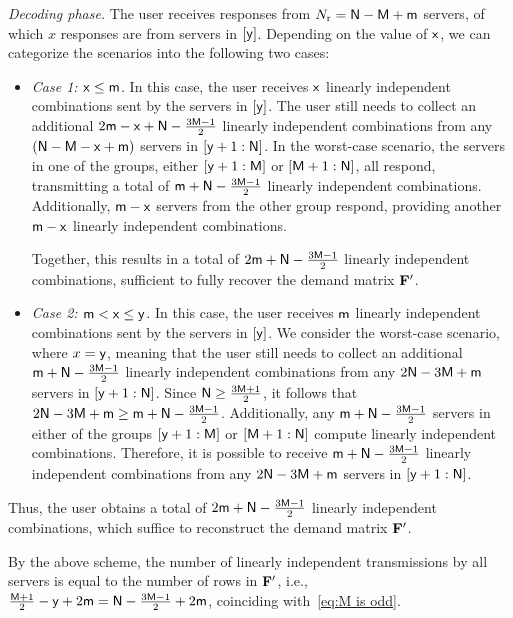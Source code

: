 \documentclass[conference,letterpaper]{IEEEtran}
\begin{document}
  
  {\it Decoding phase.}
The user receives responses from $N_{\rm r} = {\sf N} - {\sf M} + {\sf m}$ servers, of which $x$ responses are from servers in $[{\sf y}]$. Depending on the value of ${\sf x}$, we can categorize the scenarios into the following two cases:
\begin{itemize}
\item {\it Case 1: ${\sf x} \leq {\sf m}$.} In this case, the user receives ${\sf x}$ linearly independent combinations sent by the servers in $[{\sf y}]$. The user still needs to collect an additional $2{\sf m} - {\sf x} + {\sf N} - \frac{3{\sf M} - 1}{2}$ linearly independent combinations from any $({\sf N} - {\sf M} - {\sf x} + {\sf m})$ servers in $[{\sf y} + 1 : {\sf N}]$.
In the worst-case scenario, the servers in one of the groups, either $[{\sf y} + 1 : {\sf M}]$ or $[{\sf M} + 1 : {\sf N}]$, all respond, transmitting a total of ${\sf m} + {\sf N} - \frac{3{\sf M} - 1}{2}$ linearly independent combinations. Additionally, ${\sf m} - {\sf x}$ servers from the other group respond, providing another ${\sf m} - {\sf x}$ linearly independent combinations. 

Together, this results in a total of $2{\sf m} + {\sf N} - \frac{3{\sf M} - 1}{2}$ linearly independent combinations, sufficient to fully recover the demand matrix ${\bf F}'$.

\item {\it Case 2: ${\sf m} < {\sf x} \leq {\sf y}$.} In this case, the user receives ${\sf m}$ linearly independent combinations sent by the servers in $[{\sf y}]$. We consider the worst-case scenario, where $x = {\sf y}$, meaning that the user still needs to collect an additional ${\sf m} + {\sf N} - \frac{3{\sf M} - 1}{2}$ linearly independent combinations from any $2{\sf N} - 3{\sf M} + {\sf m}$ servers in $[{\sf y} + 1 : {\sf N}]$.
Since ${\sf N} \geq \frac{3{\sf M} + 1}{2}$, it follows that $2{\sf N} - 3{\sf M} + {\sf m} \geq {\sf m} + {\sf N} - \frac{3{\sf M} - 1}{2}$. Additionally, any ${\sf m} + {\sf N} - \frac{3{\sf M} - 1}{2}$ servers in either of the groups $[{\sf y} + 1 : {\sf M}]$ or $[{\sf M} + 1 : {\sf N}]$ compute linearly independent combinations. Therefore, it is possible to receive ${\sf m} + {\sf N} - \frac{3{\sf M} - 1}{2}$ linearly independent combinations from any $2{\sf N} - 3{\sf M} + {\sf m}$ servers in $[{\sf y} + 1 : {\sf N}]$.
\end{itemize}
Thus, the user obtains a total of $2{\sf m} + {\sf N} - \frac{3{\sf M} - 1}{2}$ linearly independent combinations, which suffice to reconstruct the demand matrix ${\bf F}'$.

 By the above scheme,  the number of linearly independent transmissions by all servers is equal to the number of rows in ${\bf F}'$, i.e.,
$\frac{{\sf M}+1}{2}-{\sf y}+2{\sf m} ={\sf N}- \frac{3{\sf M}-1}{2}+2{\sf m} $, coinciding with~\eqref{eq:M is odd}.
\end{document}
